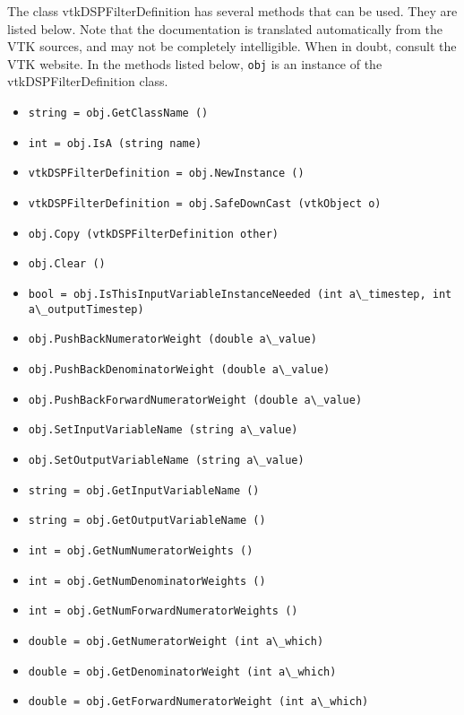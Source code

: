The class vtkDSPFilterDefinition has several methods that can be used.
  They are listed below.
Note that the documentation is translated automatically from the VTK sources,
and may not be completely intelligible.  When in doubt, consult the VTK website.
In the methods listed below, \verb|obj| is an instance of the vtkDSPFilterDefinition class.
\begin{itemize}
\item  \verb|string = obj.GetClassName ()|

\item  \verb|int = obj.IsA (string name)|

\item  \verb|vtkDSPFilterDefinition = obj.NewInstance ()|

\item  \verb|vtkDSPFilterDefinition = obj.SafeDownCast (vtkObject o)|

\item  \verb|obj.Copy (vtkDSPFilterDefinition other)|

\item  \verb|obj.Clear ()|

\item  \verb|bool = obj.IsThisInputVariableInstanceNeeded (int a\_timestep, int a\_outputTimestep)|

\item  \verb|obj.PushBackNumeratorWeight (double a\_value)|

\item  \verb|obj.PushBackDenominatorWeight (double a\_value)|

\item  \verb|obj.PushBackForwardNumeratorWeight (double a\_value)|

\item  \verb|obj.SetInputVariableName (string a\_value)|

\item  \verb|obj.SetOutputVariableName (string a\_value)|

\item  \verb|string = obj.GetInputVariableName ()|

\item  \verb|string = obj.GetOutputVariableName ()|

\item  \verb|int = obj.GetNumNumeratorWeights ()|

\item  \verb|int = obj.GetNumDenominatorWeights ()|

\item  \verb|int = obj.GetNumForwardNumeratorWeights ()|

\item  \verb|double = obj.GetNumeratorWeight (int a\_which)|

\item  \verb|double = obj.GetDenominatorWeight (int a\_which)|

\item  \verb|double = obj.GetForwardNumeratorWeight (int a\_which)|

\end{itemize}

